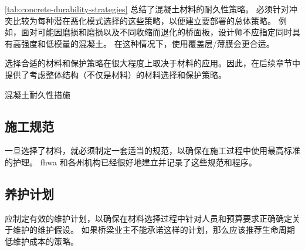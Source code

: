 \cref{tab:concrete-durability-strategies} 总结了混凝土材料的耐久性策略。 必须针对冲突比较为每种潜在恶化模式选择的这些策略，以便建立要部署的总体策略。 例如，面对可能因磨损和磨损以及不同收缩而退化的桥面板，设计师不应指定同时具有高强度和低模量的混凝土。 在这种情况下，使用覆盖层/薄膜会更合适。

选择合适的材料和保护策略在很大程度上取决于材料的应用。因此，在后续章节中提供了考虑整体结构（不仅是材料）的材料选择和保护策略。

\begin{table}
  \caption{混凝土耐久性措施}
  \label{tab:concrete-durability-strategies}
  
\end{table}

\subsection{施工规范}
一旦选择了材料，就必须制定一套适当的规范，以确保在施工过程中使用最高标准的护理。 \gls*{fhwa} 和各州机构已经很好地建立并记录了这些规范和程序。


\subsection{养护计划}
应制定有效的维护计划，以确保在材料选择过程中针对人员和预算要求正确确定关于维护的维护假设。 如果桥梁业主不能承诺这样的计划，那么应该推荐生命周期低维护成本的策略。